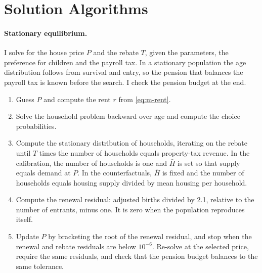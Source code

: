 




\section{Solution Algorithms}
\label{app:algorithms}

\paragraph{Stationary equilibrium.} I solve for the house price $P$ and the
rebate $T$, given the parameters, the preference for children and the payroll
tax. In a stationary population the age distribution follows from survival
and entry, so the pension that balances the payroll tax is known before the
search. I check the pension budget at the end.
\begin{enumerate}
\item Guess $P$ and compute the rent $r$ from \eqref{eq:m-rent}.
\item Solve the household problem backward over age and compute the choice
probabilities.
\item Compute the stationary distribution of households, iterating on the
rebate until $T$ times the number of households equals property-tax revenue.
In the calibration, the number of households is one and $\bar H$ is set so that
supply equals demand at $P$. In the counterfactuals, $\bar H$ is fixed and the
number of households equals housing supply divided by mean housing per
household.
\item Compute the renewal residual: adjusted births divided by 2.1, relative
to the number of entrants, minus one. It is zero when the population
reproduces itself.
\item Update $P$ by bracketing the root of the renewal residual, and stop when
the renewal and rebate residuals are below $10^{-6}$. Re-solve at the
selected price, require the same residuals, and check that the pension budget
balances to the same tolerance.
\end{enumerate}

